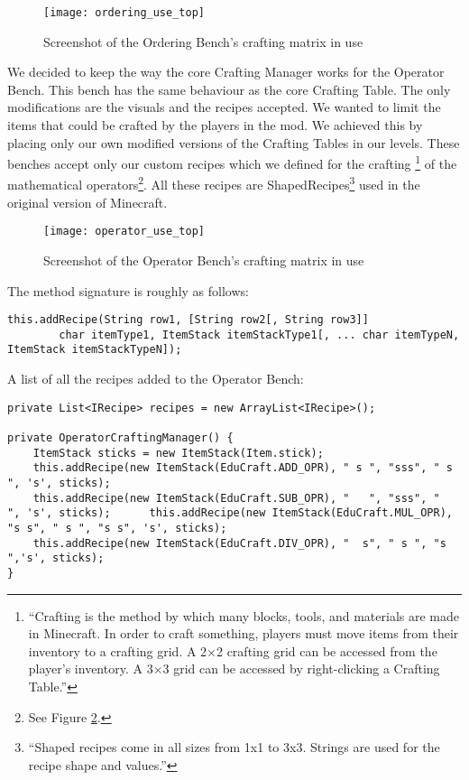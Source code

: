 \begin{figure}[H]
\label{fig:ssot-ordering}
\caption{Screenshot of the Ordering Bench's crafting matrix in use}
\centering
\texttt{[image: ordering\_use\_top]}
\end{figure}

We decided to keep the way the core Crafting Manager works for the Operator Bench. This bench has the same behaviour as the core Crafting Table. The only modifications are the visuals and the recipes accepted. We wanted to limit the items that could be crafted by the players in the mod. We achieved this by placing only our own modified versions of the Crafting Tables in our levels. These benches accept only our custom recipes which we defined for the crafting \footnote{``Crafting is the method by which many blocks, tools, and materials are made in Minecraft. In order to craft something, players must move items from their inventory to a crafting grid. A 2×2 crafting grid can be accessed from the player's inventory. A 3×3 grid can be accessed by right-clicking a Crafting Table.''} of the mathematical operators\footnote{See Figure \ref{fig:ssot-operators}.}.
All these recipes are ShapedRecipes\footnote{``Shaped recipes come in all sizes from 1x1 to 3x3. Strings are used for the recipe shape and values.''\cite{website:forge-shaped}} used in the original version of Minecraft.

\begin{figure}[H]
\label{fig:ssot-operators}
\caption{Screenshot of the Operator Bench's crafting matrix in use}
\centering
\texttt{[image: operator\_use\_top]}
\end{figure}

The method signature is roughly as follows:
\begin{lstlisting}
this.addRecipe(String row1, [String row2[, String row3]]
        char itemType1, ItemStack itemStackType1[, ... char itemTypeN, ItemStack itemStackTypeN]);
\end{lstlisting}
A list of all the recipes added to the Operator Bench:
\begin{lstlisting}
private List<IRecipe> recipes = new ArrayList<IRecipe>();

private OperatorCraftingManager() {
	ItemStack sticks = new ItemStack(Item.stick);
	this.addRecipe(new ItemStack(EduCraft.ADD_OPR), " s ", "sss", " s ", 's', sticks);
	this.addRecipe(new ItemStack(EduCraft.SUB_OPR), "   ", "sss", "   ", 's', sticks);		this.addRecipe(new ItemStack(EduCraft.MUL_OPR), "s s", " s ", "s s", 's', sticks);
	this.addRecipe(new ItemStack(EduCraft.DIV_OPR), "  s", " s ", "s  ",'s', sticks);
}
\end{lstlisting}

